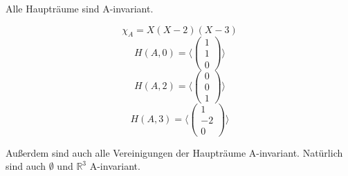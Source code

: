 \documentclass[10pt,a4paper]{article}
\begin{document}
Alle Haupträume sind A-invariant.

\begin{equation}
\chi_{A} = X(X-2)(X-3)
\end{equation}
\begin{equation}
H(A,0) = \langle
\begin{pmatrix}
1\\1\\0
\end{pmatrix}
\rangle
\end{equation}
\begin{equation}
H(A,2) = \langle
\begin{pmatrix}
0\\0\\1
\end{pmatrix}
\rangle
\end{equation}
\begin{equation}
H(A,3) = \langle
\begin{pmatrix}
1\\-2\\0
\end{pmatrix}
\rangle
\end{equation}

Außerdem sind auch alle Vereinigungen der Haupträume A-invariant.
Natürlich sind auch $\emptyset$ und $\mathbb{R}^{3}$ A-invariant.
\end{document}
